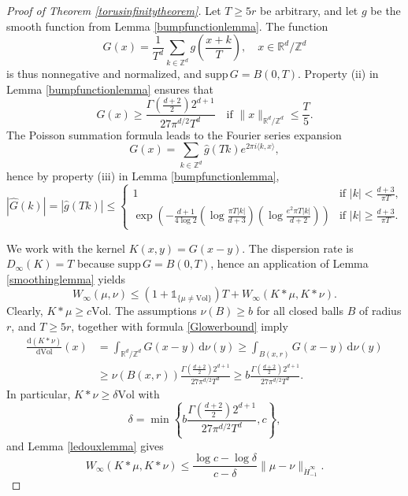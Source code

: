 \documentclass[10pt,a4paper]{amsart}
\begin{document}
\begin{proof}[Proof of Theorem \ref{torusinfinitytheorem}] Let $T \ge 5r$ be arbitrary, and let $g$ be the smooth function from Lemma \ref{bumpfunctionlemma}. The function
\[ G(x) = \frac{1}{T^d} \sum_{k \in \mathbb{Z}^d} g \left( \frac{x+k}{T} \right) , \quad x \in \mathbb{R}^d / \mathbb{Z}^d \]
is thus nonnegative and normalized, and $\mathrm{supp} \, G = B(0,T)$. Property (ii) in Lemma \ref{bumpfunctionlemma} ensures that
\begin{equation}\label{Glowerbound}
G(x) \ge \frac{\Gamma \left( \frac{d+2}{2} \right) 2^{d+1}}{27 \pi^{d/2} T^d} \quad \textrm{if } \| x \|_{\mathbb{R}^d / \mathbb{Z}^d} \le \frac{T}{5} .
\end{equation}
The Poisson summation formula leads to the Fourier series expansion
\[ G(x) = \sum_{k \in \mathbb{Z}^d} \widehat{g}(T k) e^{2 \pi i \langle k,x \rangle} , \]
hence by property (iii) in Lemma \ref{bumpfunctionlemma},
\begin{equation}\label{Ghatupperbound}
|\widehat{G}(k)| = |\widehat{g}(Tk)| \le  \left\{ \begin{array}{ll} 1 & \textrm{if } |k| < \frac{d+3}{\pi T}, \\ \exp \left( - \frac{d+1}{4 \log 2} \left( \log \frac{\pi T |k|}{d+3} \right) \left( \log \frac{e^2 \pi T |k|}{d+2} \right) \right) & \textrm{if } |k| \ge \frac{d+3}{\pi T} . \end{array} \right.
\end{equation}

We work with the kernel $K(x,y)=G(x-y)$. The dispersion rate is $D_{\infty}(K)=T$ because $\mathrm{supp} \, G = B(0,T)$, hence an application of Lemma \ref{smoothinglemma} yields
\[ W_{\infty} (\mu, \nu) \le \left( 1+\mathds{1}_{\{ \mu \neq \mathrm{Vol} \}} \right) T + W_{\infty} (K * \mu, K * \nu) . \]
Clearly, $K*\mu \ge c \mathrm{Vol}$. The assumptions $\nu (B) \ge b$ for all closed balls $B$ of radius $r$, and $T \ge 5r$, together with formula \eqref{Glowerbound} imply
\[ \begin{split} \frac{\mathrm{d}(K*\nu)}{\mathrm{d}\mathrm{Vol}}(x) &= \int_{\mathbb{R}^d / \mathbb{Z}^d} G(x-y) \, \mathrm{d}\nu (y) \ge \int_{B(x,r)} G(x-y) \, \mathrm{d}\nu (y) \\ &\ge \nu (B(x,r)) \frac{\Gamma \left( \frac{d+2}{2} \right) 2^{d+1}}{27 \pi^{d/2} T^d} \ge b \frac{\Gamma \left( \frac{d+2}{2} \right) 2^{d+1}}{27 \pi^{d/2} T^d} . \end{split} \]
In particular, $K*\nu \ge \delta \mathrm{Vol}$ with
\[ \delta = \min \left\{ b \frac{\Gamma \left( \frac{d+2}{2} \right) 2^{d+1}}{27 \pi^{d/2} T^d}, c \right\} , \]
and Lemma \ref{ledouxlemma} gives
\[ W_{\infty} (K*\mu, K*\nu) \le \frac{\log c - \log \delta}{c-\delta} \| \mu-\nu \|_{\dot{H}_{-1}^{\infty}} . \]


\end{proof}
\end{document}

